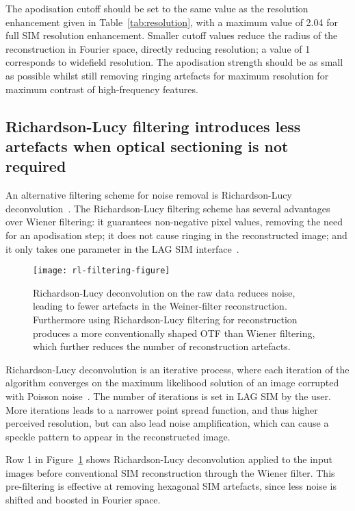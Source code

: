 The apodisation cutoff should be set to the same value as the resolution enhancement given in Table~\ref{tab:resolution}, with a maximum value of 2.04 for full SIM resolution enhancement. 
Smaller cutoff values reduce the radius of the reconstruction in Fourier space, directly reducing resolution; a value of 1 corresponds to widefield resolution. 
The apodisation strength should be as small as possible whilst still removing ringing artefacts for maximum resolution for maximum contrast of high-frequency features.  

\subsection{Richardson-Lucy filtering introduces less artefacts when optical sectioning is not required}
An alternative filtering scheme for noise removal is Richardson-Lucy deconvolution~\cite{perez2016optimal}. 
The Richardson-Lucy filtering scheme has several advantages over Wiener filtering: it guarantees non-negative pixel values, removing the need for an apodisation step; it does not cause ringing in the reconstructed image; and it only takes one parameter in the LAG SIM interface~\cite{eichstadt2013comparison, perez2016optimal}.

\begin{figure}[p]
\centering
\texttt{[image: rl-filtering-figure]}
\caption[LAG SIM: Richardson-Lucy filtering can further reduce SIM reconstruction artefacts]{Richardson-Lucy deconvolution on the raw data reduces noise, leading to fewer artefacts in the Weiner-filter reconstruction. Furthermore using Richardson-Lucy filtering for reconstruction produces a more conventionally shaped OTF than Wiener filtering, which further reduces the number of reconstruction artefacts.}
\label{fig:rl-filtering}
\end{figure}

Richardson-Lucy deconvolution is an iterative process, where each iteration of the algorithm converges on the maximum likelihood solution of an image corrupted with Poisson noise~\cite{richardson1972bayesian, lucy1974iterative}. 
The number of iterations is set in LAG SIM by the user.
More iterations leads to a narrower point spread function, and thus higher perceived resolution, but can also lead noise amplification, which can cause a speckle pattern to appear in the reconstructed image.  

Row 1 in Figure~\ref{fig:rl-filtering} shows Richardson-Lucy deconvolution applied to the input images before conventional SIM reconstruction through the Wiener filter. 
This pre-filtering is effective at removing hexagonal SIM artefacts, since less noise is shifted and boosted in Fourier space.

